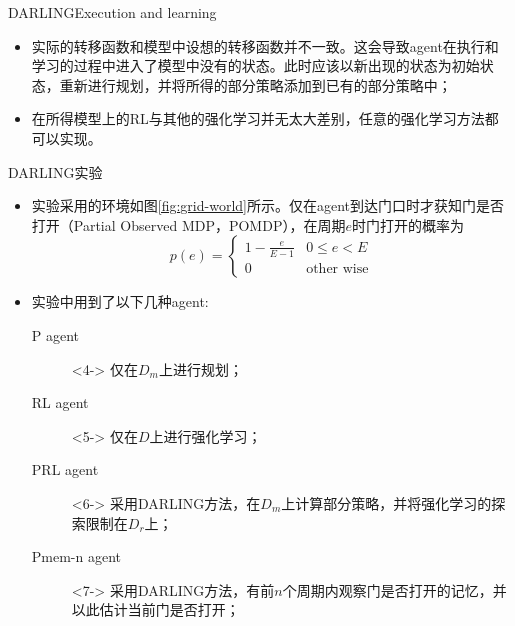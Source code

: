 \documentclass[10pt]{beamer}
\begin{document}
	\begin{frame}{DARLING}{Execution and learning}
		\begin{itemize}
		\item 实际的转移函数和模型中设想的转移函数并不一致。这会导致agent在执行和学习的过程中进入了模型中没有的状态。此时应该以新出现的状态为初始状态，重新进行规划，并将所得的部分策略添加到已有的部分策略中；
		
		\item 在所得模型上的RL与其他的强化学习并无太大差别，任意的强化学习方法都可以实现。
		\end{itemize}
	\end{frame}

	\begin{frame}{DARLING}{实验}
		\begin{itemize}
			\item<2-> 实验采用的环境如图\ref{fig:grid-world}所示。仅在agent到达门口时才获知门是否打开（Partial Observed MDP，POMDP），在周期$e$时门打开的概率为
				\[p(e)=
					\begin{cases}
						1 - \frac{e}{E-1} & 0 \leq e < E \\
						0 & \text{other wise}
					\end{cases}
				\]
			\item<3-> 实验中用到了以下几种agent:
			\begin{description}
				\item[P agent]<4-> 仅在$D_m$上进行规划；
				\item[RL agent]<5-> 仅在$D$上进行强化学习；
				\item[PRL agent]<6-> 采用DARLING方法，在$D_m$上计算部分策略，并将强化学习的探索限制在$D_r$上；
				\item[Pmem-n agent]<7-> 采用DARLING方法，有前$n$个周期内观察门是否打开的记忆，并以此估计当前门是否打开；
			\end{description}
		\end{itemize}
	\end{frame}
\end{document}
